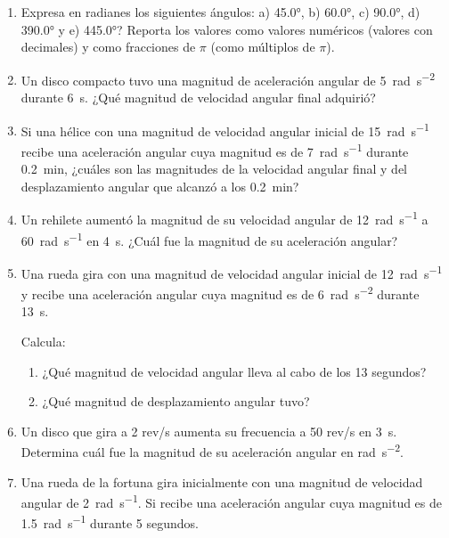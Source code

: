 \documentclass[14pt]{extarticle}
\begin{document}
\begin{enumerate}
\item Expresa en radianes los siguientes ángulos: a) \ang{45.0}, b) \ang{60.0}, c) \ang{90.0}, \break d) \ang{390.0} y e) \ang{445.0}? Reporta los valores como valores numéricos (valores con decimales) y como fracciones de $\pi$ (como múltiplos de $\pi$).
\item Un disco compacto tuvo una magnitud de aceleración angular de \SI{5}{\radian\per\square\second} durante \SI{6}{\second}. ¿Qué magnitud de velocidad angular final adquirió?
\item Si una hélice con una magnitud de velocidad angular inicial de \SI{15}{\radian\per\second} recibe una aceleración angular cuya magnitud es de \SI{7}{\radian\per\second} durante \SI{0.2}{\minute}, ¿cuáles son las magnitudes de la velocidad angular final y del desplazamiento angular que alcanzó a los \SI{0.2}{\minute}?
\item Un rehilete aumentó la magnitud de su velocidad angular de \SI{12}{\radian\per\second} a \SI{60}{\radian\per\second} en \SI{4}{\second}. ¿Cuál fue la magnitud de su aceleración angular?
\item Una rueda gira con una magnitud de velocidad angular inicial de \SI{12}{\radian\per\second} y recibe una aceleración angular cuya magnitud es de \SI{6}{\radian\per\square\second} durante \SI{13}{\second}.

Calcula:
\begin{enumerate}[label=\alph*)]
\item ¿Qué magnitud de velocidad angular lleva al cabo de los \num{13} segundos?
\item ¿Qué magnitud de desplazamiento angular tuvo?
\end{enumerate}
\item Un disco que gira a \num{2}  rev/s aumenta su frecuencia a \num{50} rev/s en \SI{3}{\second}. Determina cuál fue la magnitud de su aceleración angular en \unit{\radian\per\square\second}.
\item Una rueda de la fortuna gira inicialmente con una magnitud de velocidad angular de \SI{2}{\radian\per\second}. Si recibe una aceleración angular cuya magnitud es de \SI{1.5}{\radian\per\second} durante \num{5} segundos.


\end{enumerate}
\end{document}
